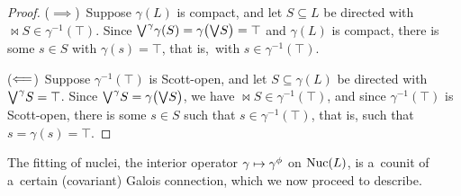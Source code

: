 \documentclass[11pt,letterpaper]{article}
\renewcommand{\thmskip}{\bigskip}
\renewcommand{\interskip}{\medskip}
\begin{document}
\interskip

\begin{proof}
($\implies$)\, Suppose $\gamma(L)$ is compact,
and let $S\subseteq L$ be directed with $\Join\!S \in \gamma^{-1}(\top)$.
Since $\bigvee^{\mspace{1mu}\gamma}\!\gamma(S) = \gamma\bigl(\bigvee\!S\bigr) = \top$ and $\gamma(L)$ is compact,
there is some $s\in S$ with $\gamma(s) = \top$, that is,~with $s\in\gamma^{-1}(\top)$.

($\mathrel{\Longleftarrow}$)\, Suppose $\gamma^{-1}(\top)$ is Scott-open,
and let $S\subseteq\gamma(L)$ be directed with $\bigvee^{\mspace{1mu}\gamma}\!S = \top$.
Since $\bigvee^{\mspace{1mu}\gamma}\!S = \gamma\bigl(\bigvee\!S\bigr)$, we have $\Join\!S\in\gamma^{-1}(\top)$,
and since $\gamma^{-1}(\top)$ is Scott-open,
there is some $s\in S$ such that $s\in\gamma^{-1}(\top)$,
that is, such that $s = \gamma(s) = \top$.
\end{proof}

\thmskip

The fitting of nuclei, the interior operator $\gamma\mapsto\gamma^\phi$ on $\mathop{\smash{\mathrm{Nuc}}}\nolimits(L)$,
is a~counit of a~certain (covariant) Galois connection, which we now proceed to describe.
\end{document}
